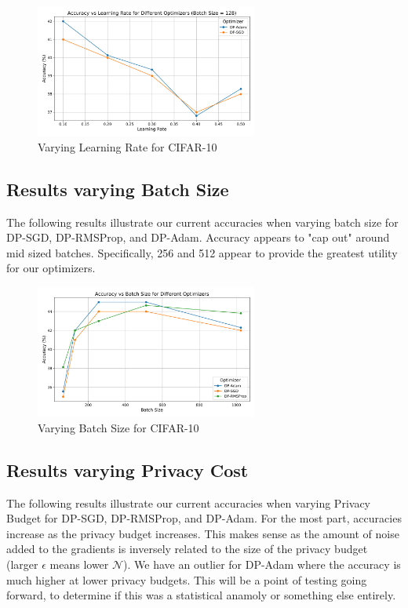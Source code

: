\begin{figure}[ht]
    \centering
    \includegraphics[width=0.65\textwidth]{accuracy_vs_learning_rate.png}
    \caption{Varying Learning Rate for CIFAR-10}
    \label{fig:image_label}
\end{figure}


\subsection{Results varying Batch Size}\label{subsec:dp-details}
The following results illustrate our current accuracies when varying batch size for DP-SGD, DP-RMSProp, and DP-Adam. Accuracy
appears to "cap out" around mid sized batches. Specifically, 256 and 512 appear to provide the greatest utility for our optimizers.
\begin{figure}[ht]
    \centering
    \includegraphics[width=0.65\textwidth]{accuracy_vs_batch_size.png}
    \caption{Varying Batch Size for CIFAR-10}
    \label{fig:image_label}
\end{figure}

\subsection{Results varying Privacy Cost}\label{subsec:dp-details}
The following results illustrate our current accuracies when varying Privacy Budget for DP-SGD, DP-RMSProp, and DP-Adam. For the most
part, accuracies increase as the privacy budget increases. This makes sense as the amount of noise added to the gradients is inversely 
related to the size of the privacy budget (larger $\epsilon$ means lower $\mathcal{N}$). We have an outlier for DP-Adam where the accuracy
is much higher at lower privacy budgets. This will be a point of testing going forward, to determine if this was a statistical anamoly or something
else entirely.

